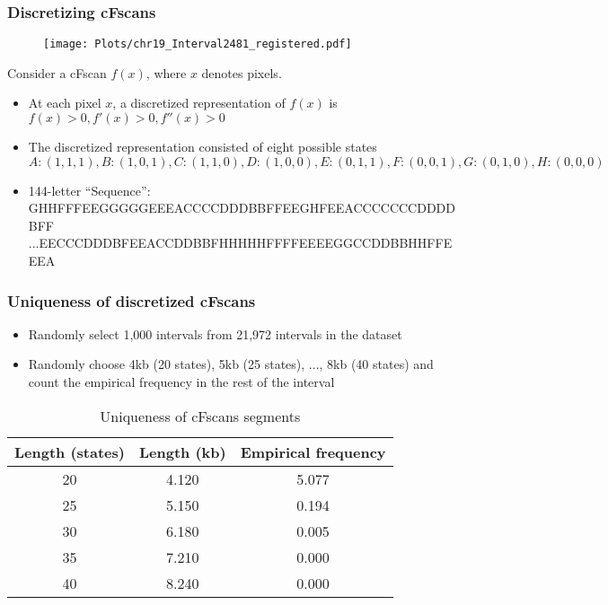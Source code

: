 \documentclass[10pt,dvipsnames,table]{beamer}
\begin{document}
\begin{frame}
\frametitle{Discretizing cFscans}
\footnotesize
\vspace{-0.5cm}
\begin{figure}
\centering
\texttt{[image: Plots/chr19\_Interval2481\_registered.pdf]}
\end{figure}
\vspace{-0.5cm}
Consider a cFscan $f(x)$, where $x$ denotes pixels.
\begin{itemize}
\item At each pixel $x$, a discretized representation of $f(x)$ is $f(x) > 0, f'(x) > 0, f''(x) > 0$
\item The discretized representation consisted of eight possible states $A: (1,1,1), B:(1,0,1), C:(1,1,0), D:(1,0,0), E:(0,1,1), F:(0,0,1), G:(0,1,0), H:(0,0,0)$
\item 144-letter ``Sequence'': GHHFFFEEGGGGGEEEACCCCDDDBBFFEEGHFEEACCCCCCCDDDDBFF ...EECCCDDDBFEEACCDDBBFHHHHHFFFFEEEEGGCCDDBBHHFFEEEA
\end{itemize}

\end{frame}

\begin{frame}
\frametitle{Uniqueness of discretized cFscans}
\begin{itemize}
\item Randomly select 1,000 intervals from 21,972 intervals in the dataset
\item Randomly choose 4kb (20 states), 5kb (25 states), ..., 8kb (40 states) and count the empirical frequency in the rest of the interval
\end{itemize}

\begin{table}[H]
\centering
\caption{Uniqueness of cFscans segments} 
\begin{tabular}{c|c|c}
\hline
\hline
Length (states) & Length (kb) 	& Empirical frequency 	\\
\hline
20 		& 4.120		& 5.077 		\\
25		& 5.150		& 0.194			\\
30		& 6.180		& 0.005			\\
35		& 7.210		& 0.000			\\
40		& 8.240		& 0.000			\\
\hline
\hline
\end{tabular}
\end{table}
\end{frame}
\end{document}
